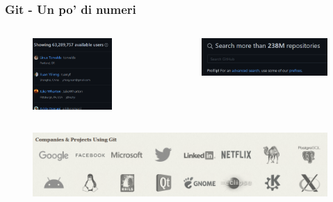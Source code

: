 \documentclass{beamer}
\begin{document}
\begin{frame}
	\frametitle{Git - Un po' di numeri}

	\begin{columns}
		\begin{figure}
			\centering
			\includegraphics[width=0.8\textwidth]{users.png}
		\end{figure}
		\begin{figure}
			\centering
			\bigskip\bigskip
			\hspace*{-1cm}
			\includegraphics[width=\textwidth]{numberrepo.png}
		\end{figure}
	\end{columns}
	\begin{figure}
		\centering
		\includegraphics[width=\textwidth]{companies.png}
	\end{figure}
\end{frame}
\end{document}
